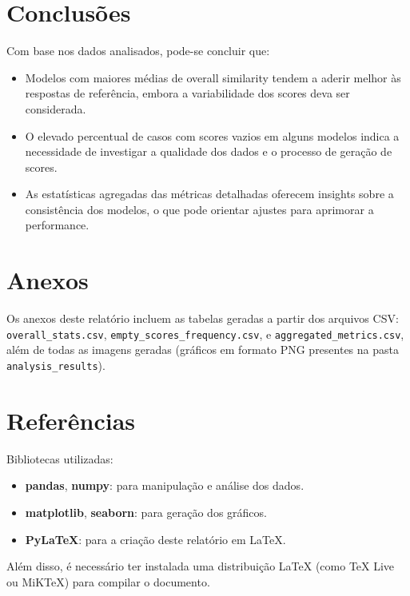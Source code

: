 \documentclass{article}%
\begin{document}
%
\section*{Conclusões}%
\label{sec:Concluses}%

Com base nos dados analisados, pode-se concluir que:
\begin{itemize}
    \item Modelos com maiores médias de overall similarity tendem a aderir melhor às respostas de referência, embora a variabilidade dos scores deva ser considerada.
    \item O elevado percentual de casos com scores vazios em alguns modelos indica a necessidade de investigar a qualidade dos dados e o processo de geração de scores.
    \item As estatísticas agregadas das métricas detalhadas oferecem insights sobre a consistência dos modelos, o que pode orientar ajustes para aprimorar a performance.
\end{itemize}

%
\section*{Anexos}%
\label{sec:Anexos}%
Os anexos deste relatório incluem as tabelas geradas a partir dos arquivos CSV: \texttt{overall\_stats.csv}, \texttt{empty\_scores\_frequency.csv}, e \texttt{aggregated\_metrics.csv}, além de todas as imagens geradas (gráficos em formato PNG presentes na pasta \texttt{analysis\_results}).

%
\section*{Referências}%
\label{sec:Referncias}%
Bibliotecas utilizadas: \begin{itemize}\item \textbf{pandas}, \textbf{numpy}: para manipulação e análise dos dados.\item \textbf{matplotlib}, \textbf{seaborn}: para geração dos gráficos.\item \textbf{PyLaTeX}: para a criação deste relatório em LaTeX.\end{itemize} Além disso, é necessário ter instalada uma distribuição LaTeX (como TeX Live ou MiKTeX) para compilar o documento.

%
\end{document}
